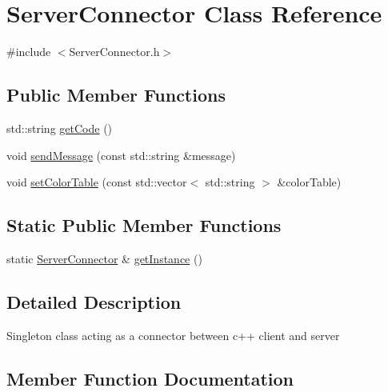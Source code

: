 \hypertarget{classServerConnector}{}\section{Server\+Connector Class Reference}
\label{classServerConnector}


{\ttfamily \#include $<$Server\+Connector.\+h$>$}

\subsection*{Public Member Functions}
\begin{DoxyCompactItemize}
\item 
std\+::string \hyperlink{classServerConnector_a92138ee10522c4fb7178a5a49a7612f0}{get\+Code} ()
\item 
void \hyperlink{classServerConnector_a2963c73cef3f803103a558cd13d5ed86}{send\+Message} (const std\+::string \&message)
\item 
void \hyperlink{classServerConnector_a382cdb4cb863d8c073c6f1a5154e5bce}{set\+Color\+Table} (const std\+::vector$<$ std\+::string $>$ \&color\+Table)
\end{DoxyCompactItemize}
\subsection*{Static Public Member Functions}
\begin{DoxyCompactItemize}
\item 
static \hyperlink{classServerConnector}{Server\+Connector} \& \hyperlink{classServerConnector_a1b254a471399bbb440ea7978cba085c9}{get\+Instance} ()
\end{DoxyCompactItemize}


\subsection{Detailed Description}
Singleton class acting as a connector between c++ client and server 

\subsection{Member Function Documentation}
\mbox{\label{classServerConnector_a92138ee10522c4fb7178a5a49a7612f0}} 
